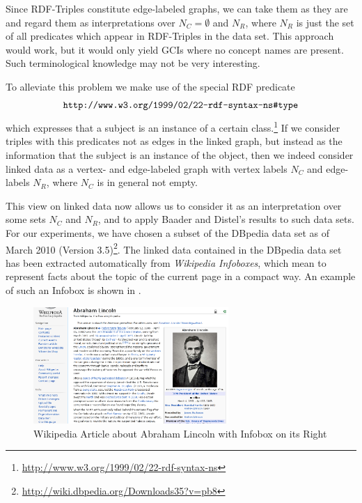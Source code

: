 Since RDF-Triples constitute edge-labeled graphs, we can take them as they are and regard
them as interpretations over $N_C = \emptyset$ and $N_R$, where $N_R$ is just the set of
all predicates which appear in RDF-Triples in the data set.  This approach would work, but
it would only yield GCIs where no concept names are present.  Such terminological
knowledge may not be very interesting.

To alleviate this problem we make use of the special RDF predicate
\begin{equation}
  \label{eq:16}
  \verb|http://www.w3.org/1999/02/22-rdf-syntax-ns#type|
\end{equation}
which expresses that a subject is an instance of a certain
class.\footnote{\url{http://www.w3.org/1999/02/22-rdf-syntax-ns}} If we consider triples
with this predicates not as edges in the linked graph, but instead as the information that
the subject is an instance of the object, then we indeed consider linked data as a vertex-
and edge-labeled graph with vertex labels $N_C$ and edge-labels $N_R$, where $N_C$ is in
general not empty.

This view on linked data now allows us to consider it as an interpretation over some sets
$N_C$ and $N_R$, and to apply Baader and Distel's results to such data sets.  For our
experiments, we have chosen a subset of the DBpedia data set as of March 2010 (Version
3.5)\footnote{\url{http://wiki.dbpedia.org/Downloads35?v=pb8}}.  The linked data contained
in the DBpedia data set has been extracted automatically from \emph{Wikipedia Infoboxes},
which mean to represent facts about the topic of the current page in a compact way.  An
example of such an Infobox is shown in .

\begin{figure}[tp]
  \centering
  \includegraphics[width=20em]{chapters/lincoln-infobox.png}
  \caption{Wikipedia Article about Abraham Lincoln with Infobox on its Right}
  \label{fig:infobox-screenshot}
\end{figure}

